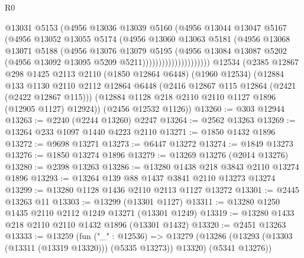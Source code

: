 \begin{lexlean}{R0}
\begin{coremodule}
                              @13031
                              @5153
                              (@4956
                                @13036
                                @13039
                                @5160
                                (@4956
                                  @13044
                                  @13047
                                  @5167
                                  (@4956
                                    @13052
                                    @13055
                                    @5174
                                    (@4956
                                      @13060
                                      @13063
                                      @5181
                                      (@4956
                                        @13068
                                        @13071
                                        @5188
                                        (@4956
                                          @13076
                                          @13079
                                          @5195
                                          (@4956
                                            @13084
                                            @13087
                                            @5202
                                            (@4956 @13092 @13095 @5209 @5211)))))))))))))))))))))
    @12534
    (@2385
      @12867
      @298
      @1425
      @2113
      @2110
      (@1850 @12864 @6448)
      (@1960 @12534)
      (@12884
        @133
        @1130
        @2110
        @2112
        @12864
        @6448
        (@2416 @12867 @115 @12864 (@2421 (@2422 @12867 @115)))
        (@12884 @1128 @218 @2110 @2110 @1127 @1896 (@12905 @1127) @12924))
      (@2456 @12532 @1126))
@13260 := @303 @12944
@13263 := @2240 (@2244 @13260) @2247
@13264 := @2562 @13263
@13269 := @13264 @233 @1097 @1440 @4223 @2110
@13271 := @1850 @1432 @1896
@13272 := @9698 @13271
@13273 := @6447 @13272
@13274 := @1849 @13273
@13276 := @1850 @13274 @1896
@13279 := @13269 @13276 (@2014 @13276)
@13280 := @2398 @13263
@13286 := @13280 @1438 @218 @3843 @2110 @13274 @1896
@13293 := @13264 @139 @88 @1437 @3841 @2110 @13273 @13274
@13299 := @13280 @1128 @1436 @2110 @2113 @1127 @13272
@13301 := @2445 @13263 @11
@13303 := @13299 (@13301 @1127)
@13311 := @13280 @1250 @1435 @2110 @2112 @1249 @13271 (@13301 @1249)
@13319 := @13280 @1433 @218 @2110 @2110 @1432 @1896 (@13301 @1432)
@13320 := @2451 @13263
@13333 := @13259
    (fun ("_" : @12536) =>
    @13279 (@13286 (@13293 (@13303 (@13311 (@13319 @13320))) (@5335 @13273)) @13320) (@5341 @13276))

\end{coremodule}
\end{lexlean}
